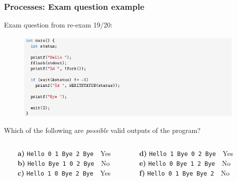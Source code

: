 \documentclass[xcolor={usenames,dvipsnames}]{beamer}
\begin{document}
%
%
%
\begin{frame}
\frametitle{Processes: Exam question example}
Exam question from re-exam 19/20:

\vspace{-3mm}
\begin{figure}
\includegraphics[width=1.0\textwidth]{images/exam_question_1_fork.png}
\end{figure}
\vspace{-3mm}
Which of the following are \textit{possible} valid outputs of the program?
\vspace{2mm}

\begin{columns}
\begin{column}{0.5\textwidth}
\footnotesize
\ \ \ \ \textbf{a)} \texttt{Hello 0 1 Bye 2 Bye}\ \ {\color{OliveGreen}Yes}\\
\ \ \ \ \textbf{b)} \texttt{Hello Bye 1 0 2 Bye}\ \ {\color{red}No}\\
\ \ \ \ \textbf{c)} \texttt{Hello 1 0 Bye 2 Bye}\ \ {\color{OliveGreen}Yes}
\end{column}
\begin{column}{0.5\textwidth}  %
\footnotesize
\textbf{d)} \texttt{Hello 1 Bye 0 2 Bye}\ \ {\color{OliveGreen}Yes}\\
\textbf{e)} \texttt{Hello 0 Bye 1 2 Bye}\ \ {\color{red}No}\\
\textbf{f)} \texttt{Hello 0 1 Bye Bye 2}\ \ {\color{red}No}
\end{column}
\end{columns}

\end{frame}
\end{document}
